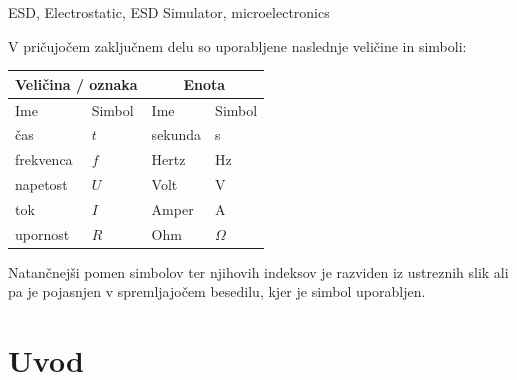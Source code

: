 \documentclass[a4paper,twoside,openright,12pt,Slovene]{book}
\begin{document}
\keywords
ESD, Electrostatic, ESD Simulator, microelectronics


\tableofcontents

\seznamslik
\seznamtabel

\seznamsimbolov
V pričujočem zaključnem delu so uporabljene naslednje veličine in simboli:

\begin{center}
    \begin{tabular}{*{4}{l}} \hline
        \multicolumn{2}{c}{\bf{Veličina / oznaka}}           & \multicolumn{2}{c}{\bf{Enota}} \\ \hline
        Ime                & Simbol                          & Ime      & Simbol              \\ \hline
        čas                & $t$                             & sekunda  & s                   \\
        frekvenca          & $f$                             & Hertz    & Hz                  \\
        napetost           & $U$                             & Volt     & V                  \\
        tok                & $I$                             & Amper    & A                   \\
        upornost           & $R$                             & Ohm      & $\Omega$            \\ \hline

    \end{tabular}
\end{center}

Natančnejši pomen simbolov ter njihovih indeksov je razviden iz ustreznih slik ali pa je pojasnjen v spremljajočem besedilu, kjer je simbol uporabljen.

\mainmatter

\chapter{Uvod} \label{uvod}
\end{document}
